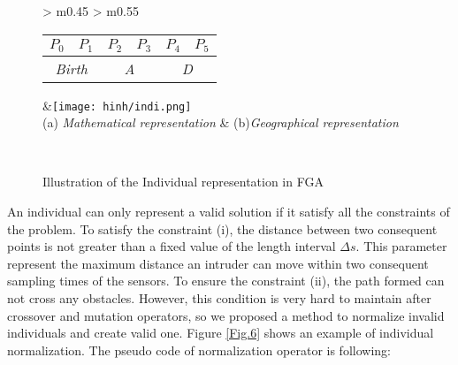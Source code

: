 \documentclass[final]{elsarticle}
\begin{document}
\begin{figure*}[h]
	\renewcommand{\arraystretch}{1.5}
	\centering
	\begin{tabular}{ >{\centering\arraybackslash} m{0.45\linewidth} >{\centering\arraybackslash} m{0.55\linewidth} }
		\begin{tabular}{|c|c|c|c|c|c|}
			\hline 
			$P_0$ & $P_1$ & $P_2$ & $P_3$ & $P_4$ & $P_5$  \\
			\hline 
			\multicolumn{2}{|c|}{\textit{Birth}} & \multicolumn{2}{c|}{\textit{A}}  & \multicolumn{2}{c|}{\textit{D}}  \\
			\hline
		\end{tabular} &\texttt{[image: hinh/indi.png]} \\
		(a) \textit{Mathematical representation} & (b)\textit{Geographical representation} \\
	\end{tabular}
	\\
	\caption{Illustration of the Individual representation in FGA
	}
	\label{Fig.4}       %
\end{figure*}

An individual can only represent a valid solution if it satisfy all the constraints of the problem. To satisfy the constraint (i), the distance between two consequent points is not greater than a fixed value of the length interval $\Delta s$. This parameter represent the maximum distance an intruder can move within two consequent sampling times of the sensors. To ensure the constraint (ii), the path formed can not cross any obstacles. However, this condition is very hard to maintain after crossover and mutation operators, so we proposed a method to normalize invalid individuals and create valid one. Figure \ref{Fig.6} shows an example of individual normalization. The pseudo code of normalization operator is following:
\end{document}
